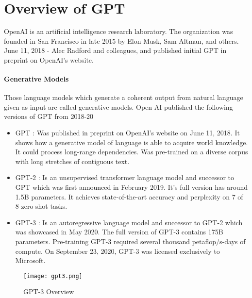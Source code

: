 \chapter*{Overview of GPT}
\label{chap:overview}
\thispagestyle{fancy}

\hspace{0.5cm} OpenAI is an artificial intelligence research laboratory. The organization was founded in San Francisco in late 2015 by Elon Musk, Sam Altman, and others. June 11, 2018 - Alec Radford and colleagues, and published initial GPT in preprint on OpenAI's website. 

\subsubsection*{Generative Models}
\label{subsub:genmodls}

\hspace{0.5cm} Those language models which generate a coherent output from natural language given as input are called generative models. Open AI published the following versions of GPT from 2018-20

\begin{itemize}
    \item GPT : Was published in preprint on OpenAI's website on June 11, 2018. It shows how a generative model of language is able to acquire world knowledge. It could process long-range dependencies. Was pre-trained on a diverse corpus with long stretches of contiguous text.
    \item GPT-2 : Is an unsupervised transformer language model and successor to GPT which was first announced in February 2019. It's full version has around 1.5B parameters. It achieves state-of-the-art accuracy and perplexity on 7 of 8 zero-shot tasks.
    \item GPT-3 : Is an autoregressive language model and successor to GPT-2 which was showcased in May 2020. The full version of GPT-3 contains 175B parameters. Pre-training GPT-3 required several thousand petaflop/s-days of compute. On September 23, 2020, GPT-3 was licensed exclusively to Microsoft.
\end{itemize}

\begin{figure}[!htbp]
    \centering
    \texttt{[image: gpt3.png]}
    \caption[GPT-3 Overview]{GPT-3 Overview}
    \label{fig:gpt3ovrviw}
\end{figure}

\vspace*{\fill}